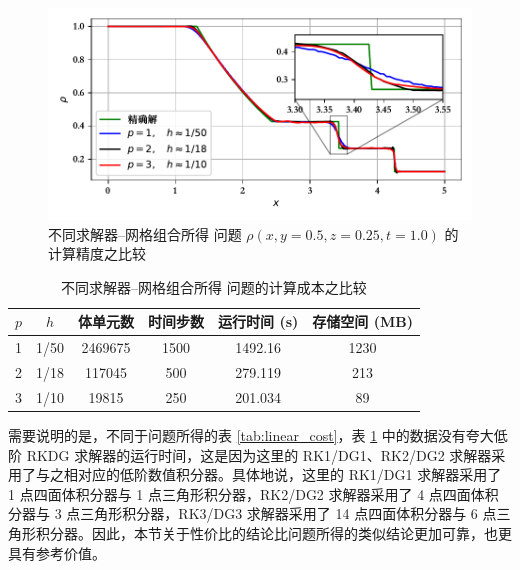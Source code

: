 \begin{figure}[h!]
\begin{centering}
\includegraphics[width=1\textwidth,height=0.3\textheight]{figures/shock_tubes/sod/h_vary_tetra}
\par\end{centering}
\caption{\label{fig:sod_error}不同求解器–网格组合所得 问题
$\rho(x,y=0.5,z=0.25,t=1.0)$ 的计算精度之比较}
\end{figure}

\begin{table}
\caption{\label{tab:sod_cost}不同求解器–网格组合所得 问题的计算成本之比较}

\centering{}%
\begin{tabular}{cccccc}
\toprule 
$p$ & $h$ & 体单元数 & 时间步数 & 运行时间 (s) & 存储空间 (MB)\tabularnewline
\midrule 
1 & 1/50 & 2469675 & 1500 & 1492.16 & 1230\tabularnewline
2 & 1/18 & 117045 & 500 & 279.119 & 213\tabularnewline
3 & 1/10 & 19815 & 250 & 201.034 & 89\tabularnewline
\bottomrule
\end{tabular}
\end{table}

需要说明的是，不同于问题所得的表
\ref{tab:linear_cost}，表 \ref{tab:sod_cost} 中的数据没有夸大低阶 RKDG 求解器的运行时间，这是因为这里的
RK1/DG1、RK2/DG2 求解器采用了与之相对应的低阶数值积分器。具体地说，这里的 RK1/DG1 求解器采用了 1 点四面体积分器与
1 点三角形积分器，RK2/DG2 求解器采用了 4 点四面体积分器与 3 点三角形积分器，RK3/DG3 求解器采用了 14 点四面体积分器与
6 点三角形积分器。因此，本节关于性价比的结论比问题所得的类似结论更加可靠，也更具有参考价值。

\newpage{}

